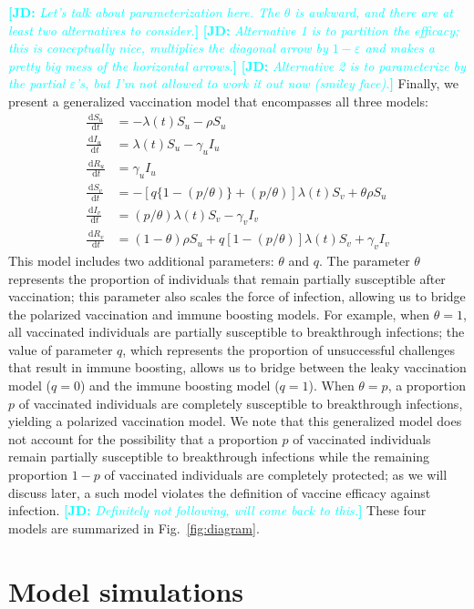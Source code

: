 \documentclass[12pt]{article}
\newcommand{\comment}{\showcomment}
\newcommand{\showcomment}[3]{\textcolor{#1}{\textbf{[#2: }\textsl{#3}\textbf{]}}}
\newcommand{\jd}[1]{\comment{cyan}{JD}{#1}}
\newcommand{\fref}[1]{Fig.~\ref{fig:#1}}
\newcommand{\dd}[1]{\ensuremath{\, \mathrm{d}#1}}
\begin{document}
\jd{Let's talk about parameterization here. The $\theta$ is awkward, and there are at least two alternatives to consider.}
\jd{Alternative 1 is to partition the efficacy; this is conceptually nice, multiplies the diagonal arrow by $1-\varepsilon$ and makes a pretty big mess of the horizontal arrows.}
\jd{Alternative 2 is to parameterize by the partial $\varepsilon$'s, but I'm not allowed to work it out now (smiley face).}
Finally, we present a generalized vaccination model that encompasses all three models:
\begin{align}
\frac{\dd S_u}{\dd t} &= - \lambda(t) S_u - \rho S_u \\
\frac{\dd I_u}{\dd t} &= \lambda(t) S_u - \gamma_u I_u \\
\frac{\dd R_u}{\dd t} &= \gamma_u I_u \\
\frac{\dd S_v}{\dd t} &= - [q \{1-(p/\theta)\} + (p/\theta)] \lambda(t) S_v + \theta \rho S_u \\
\frac{\dd I_v}{\dd t} &= (p/\theta) \lambda(t) S_v - \gamma_v I_v \\
\frac{\dd R_v}{\dd t} &= (1 - \theta) \rho S_u + q [1-(p/\theta)] \lambda(t) S_v + \gamma_v I_v
\end{align}
This model includes two additional parameters: $\theta$ and $q$.
The parameter $\theta$ represents the proportion of individuals that remain partially susceptible after vaccination;
this parameter also scales the force of infection, allowing us to bridge the polarized vaccination and immune boosting models.
For example, when $\theta = 1$, all vaccinated individuals are partially susceptible to breakthrough infections;
the value of parameter $q$, which represents the proportion of unsuccessful challenges that result in immune boosting, allows us to bridge between the leaky vaccination model ($q=0$) and the immune boosting model ($q = 1$).
When $\theta = p$, a proportion $p$ of vaccinated individuals are completely susceptible to breakthrough infections, yielding a polarized vaccination model.
We note that this generalized model does not account for the possibility that a proportion $p$ of vaccinated individuals remain partially susceptible to breakthrough infections while the remaining proportion $1-p$ of vaccinated individuals are completely protected; 
as we will discuss later, a such model violates the definition of vaccine efficacy against infection.
\jd{Definitely not following, will come back to this.}
These four models are summarized in \fref{diagram}.

\section*{Model simulations}
\end{document}
